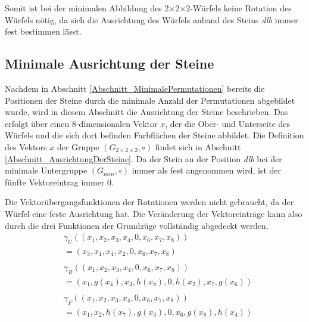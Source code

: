 \documentclass[12pt,a4paper, usenames, dvipsnames]{article}
\theoremstyle{mystyle}
\theoremstyle{definition}
\newcommand{\Gtwo}{\ensuremath{G_{2\times 2\times 2}}}
\newcommand{\Ttwo}{2$\times$2$\times$2-}
\begin{document}
Somit ist bei der minimalen Abbildung des \Ttwo Würfels keine Rotation des Würfels nötig, da sich die Ausrichtung des Würfels anhand des Steins \textit{dlb} immer fest bestimmen lässt.

%
%
%
%
%
%
%
%
%
%
%
%
%
%
%
%
%
%
\subsection{Minimale Ausrichtung der Steine}

Nachdem in Abschnitt \ref{Abschnitt_MinimalePermutationen} bereits die Positionen der Steine durch die minimale Anzahl der Permutationen abgebildet wurde, wird in diesem Abschnitt die Ausrichtung der Steine beschrieben. Das erfolgt über einen 8-dimensionalen Vektor $x$, der die Ober- und Unterseite des Würfels und die sich dort befinden Farbflächen der Steine abbildet. Die Definition des Vektors $x$ der Gruppe $(\Gtwo, \circ)$ findet sich in Abschnitt \ref{Abschnitt_AusrichtungDerSteine}.
Da der Stein an der Position \textit{dlb} bei der minimale Untergruppe $(G_{min}, \circ)$ immer als fest angenommen wird, ist der fünfte Vektoreintrag immer 0. 

Die Vektorübergangsfunktionen der Rotationen werden nicht gebraucht, da der Würfel eine feste Ausrichtung hat. Die Veränderung der Vektoreinträge kann also durch die drei Funktionen der Grundzüge vollständig abgedeckt werden.
\begin{align*}
& \gamma_U \left( (x_1, x_2, x_3, x_4, 0, x_6, x_7, x_8  ) \right) \\ 
& =  \left( x_3, x_1, x_4, x_2, 0, x_6, x_7, x_8 \right) \\
\\ 
& \gamma_R \left( (x_1, x_2, x_3, x_4, 0, x_6, x_7, x_8  ) \right) \\ 
& =  \left( x_1, g(x_4), x_3, h(x_8), 0, h(x_2), x_7, g(x_6) \right) \\ 
\\
& \gamma_F \left( (x_1, x_2, x_3, x_4, 0, x_6, x_7, x_8  ) \right) \\ 
& =  \left( x_1, x_2, h(x_7), g(x_3), 0, x_6, g(x_8), h(x_4) \right) \\
\end{align*}


%
%
%
%
%
%
%
%
%
%
%
%
%
%
%
%
%
%
\end{document}
